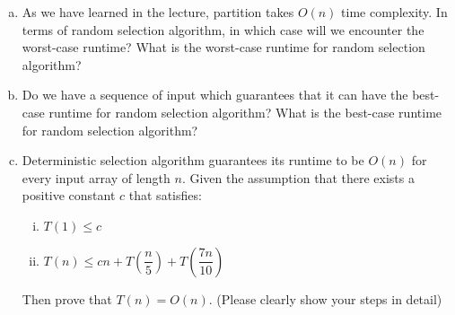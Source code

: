 \documentclass[11pt]{exam}
\begin{document}
\begin{enumerate}[(a)]
\item As we have learned in the lecture, partition takes $O(n)$ time complexity. In terms of random selection algorithm, in which case will we encounter the worst-case runtime? What is the worst-case runtime for random selection algorithm?

\item Do we have a sequence of input which guarantees that it can have the best-case runtime for random selection algorithm? What is the best-case runtime for random selection algorithm?

\item Deterministic selection algorithm guarantees its runtime to be $O(n)$ for every input array of length $n$. Given the assumption that there exists a positive constant $c$ that satisfies:
\begin{enumerate}[i)]
\item $T(1)\leq c$
\item $T(n) \leq cn + T\left(\dfrac{n}{5}\right) +  T\left(\dfrac{7n}{10}\right)$
\end{enumerate}

Then prove that $T(n) = O(n)$. (Please clearly show your steps in detail)
\end{enumerate}

\begin{solution}
\end{solution}
\end{document}
